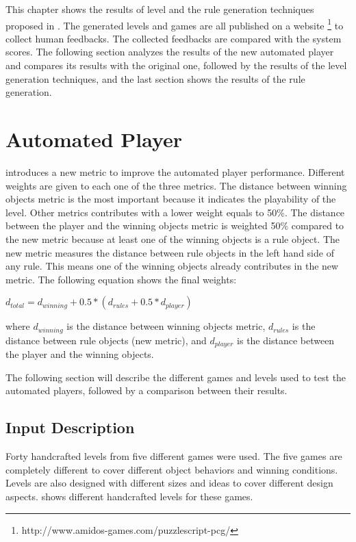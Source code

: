 This chapter shows the results of level and the rule generation techniques proposed in . The generated levels and games are all published on a website \footnote{http://www.amidos-games.com/puzzlescript-pcg/} to collect human feedbacks. The collected feedbacks are compared with the system scores. The following section analyzes the results of the new automated player and compares its results with the original one, followed by the results of the level generation techniques, and the last section shows the results of the rule generation.\\\par

\section{Automated Player}
 introduces a new metric to improve the automated player performance. Different weights are given to each one of the three metrics. The distance between winning objects metric is the most important because it indicates the playability of the level. Other metrics contributes with a lower weight equals to 50\%. The distance between the player and the winning objects metric is weighted 50\% compared to the new metric because at least one of the winning objects is a rule object. The new metric measures the distance between rule objects in the left hand side of any rule. This means one of the winning objects already contributes in the new metric. The following equation shows the final weights:
\begin{center}$d_{total} = d_{winning} + 0.5 * (d_{rules} + 0.5 * d_{player})$\end{center}
where $d_{winning}$ is the distance between winning objects metric, $d_{rules}$ is the distance between rule objects (new metric), and $d_{player}$ is the distance between the player and the winning objects.\\\par

The following section will describe the different games and levels used to test the automated players, followed by a comparison between their results.

\subsection{Input Description}
Forty handcrafted levels from five different games were used. The five games are completely different to cover different object behaviors and winning conditions. Levels are also designed with different sizes and ideas to cover different design aspects.  shows different handcrafted levels for these games.

